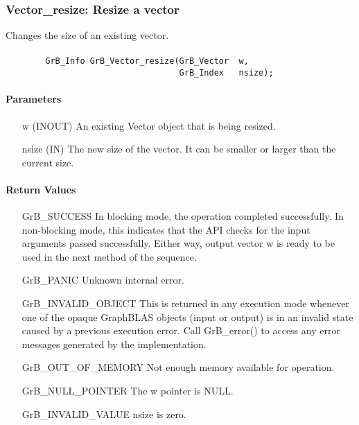 \subsubsection{{\sf Vector\_resize}: Resize a vector}

Changes the size of an existing vector.

\paragraph{\syntax}

\begin{verbatim}
        GrB_Info GrB_Vector_resize(GrB_Vector  w,
                                   GrB_Index   nsize);
\end{verbatim}

\paragraph{Parameters}

\begin{itemize}[leftmargin=1.1in]
    \item[{\sf w}] ({\sf INOUT}) An existing Vector object that is being resized.
    \item[{\sf nsize}] ({\sf IN}) The new size of the vector. It can be smaller or larger than the current size.
\end{itemize}

\paragraph{Return Values}

\begin{itemize}[leftmargin=2.1in]
    \item[{\sf GrB\_SUCCESS}]         In blocking mode, the operation completed
    successfully. In non-blocking mode, this indicates that the API checks 
    for the input arguments passed successfully. Either way, output vector 
    {\sf w} is ready to be used in the next method of the sequence.

    \item[{\sf GrB\_PANIC}]           Unknown internal error.
    
    \item[{\sf GrB\_INVALID\_OBJECT}] This is returned in any execution mode 
    whenever one of the opaque GraphBLAS objects (input or output) is in an invalid 
    state caused by a previous execution error.  Call {\sf GrB\_error()} to access 
    any error messages generated by the implementation.

    \item[{\sf GrB\_OUT\_OF\_MEMORY}] Not enough memory available for operation.
    
    \item[{\sf GrB\_NULL\_POINTER}]  The {\sf w} pointer is {\sf NULL}.
    
    \item[{\sf GrB\_INVALID\_VALUE}] {\sf nsize} is zero.
\end{itemize}

